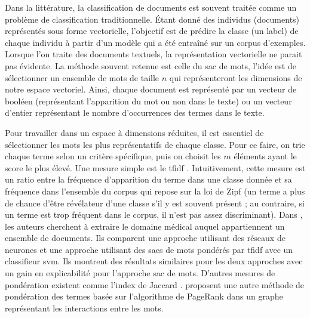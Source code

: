 Dans la littérature, la classification de documents est souvent traitée comme un problème de classification traditionnelle.
Étant donné des individus (documents) représentés sous forme vectorielle, l'objectif est de prédire la classe (un label) de chaque individu à partir d'un modèle qui a été entraîné sur un corpus d'exemples.
Lorsque l'on traite des documents textuels, la représentation vectorielle ne parait pas évidente.
La méthode souvent retenue est celle du sac de mots, l'idée est de sélectionner un ensemble de mots de taille $n$ qui représenteront les dimensions de notre espace vectoriel.
Ainsi, chaque document est représenté par un vecteur de booléen (représentant l'apparition du mot ou non dans le texte) ou un vecteur d'entier représentant le nombre d'occurrences des termes dans le texte.

Pour travailler dans un espace à dimensions réduites, il est essentiel de sélectionner les mots les plus représentatifs de chaque classe.
Pour ce faire, on trie chaque terme selon un critère spécifique, puis on choisit les $m$ éléments ayant le score le plus élevé.
Une mesure simple est le \gls{tfidf} \cite{sparckjonesStatisticalInterpretationTerm1972}.
Intuitivement, cette mesure est un ratio entre la fréquence d'apparition du terme dans une classe donnée et sa fréquence dans l'ensemble du corpus qui repose sur la loi de Zipf \cite{zipfPsychobiologyLanguage1935} (un terme a plus de chance d'être révélateur d'une classe s'il y est souvent présent ; au contraire, si un terme est trop fréquent dans le corpus, il n'est pas assez discriminant).
Dans \cite{wengMedicalSubdomainClassification2017}, les auteurs cherchent à extraire le domaine médical auquel appartiennent un ensemble de documents.
Ils comparent une approche utilisant des réseaux de neurones et une approche utilisant des sacs de mots pondérés par \gls{tfidf} avec un classifieur \gls{svm}.
Ils montrent des résultats similaires pour les deux approches avec un gain en explicabilité pour l'approche sac de mots.
D'autres mesures de pondération existent comme l'index de Jaccard \cite{jaccardDistributionFloreAlpine1901}.
\cite{mihalceaTextrankBringingOrder2004} proposent une autre méthode de pondération des termes basée sur l'algorithme de PageRank \cite{brinAnatomyLargescaleHypertextual1998} dans un graphe représentant les interactions entre les mots.

